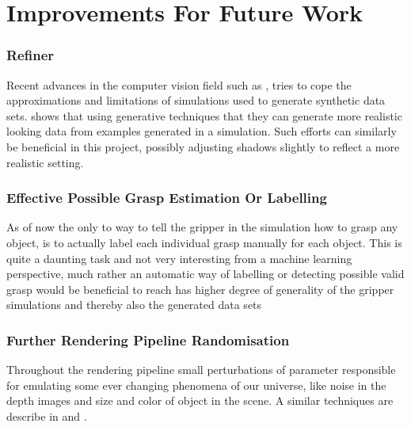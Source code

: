 \section{Improvements For Future Work}

\subsubsection{Refiner}
Recent advances in the computer vision field such as \cite{applerefiner}, tries to cope the approximations and limitations of simulations used to generate synthetic data sets. \cite{applerefiner} shows that using generative techniques that they can generate more realistic looking data from examples generated in a simulation. Such efforts can similarly be beneficial in this project, possibly adjusting shadows slightly to reflect a more realistic setting. 

\subsubsection{Effective Possible Grasp Estimation Or Labelling}
As of now the only to way to tell the gripper in the simulation how to grasp any object, is to actually label each individual grasp manually for each object. This is quite a daunting task and not very interesting from a machine learning perspective, much rather an automatic way of labelling or detecting possible valid grasp would be beneficial to reach has higher degree of generality of the gripper simulations and thereby also the generated data sets

\subsubsection{Further Rendering Pipeline Randomisation}
Throughout the rendering pipeline small perturbations of parameter responsible for emulating some ever changing phenomena of our universe, like noise in the depth images and size and color of object in the scene. A similar techniques are describe in \cite{Shotton2013} and \cite{Tobin2017}.